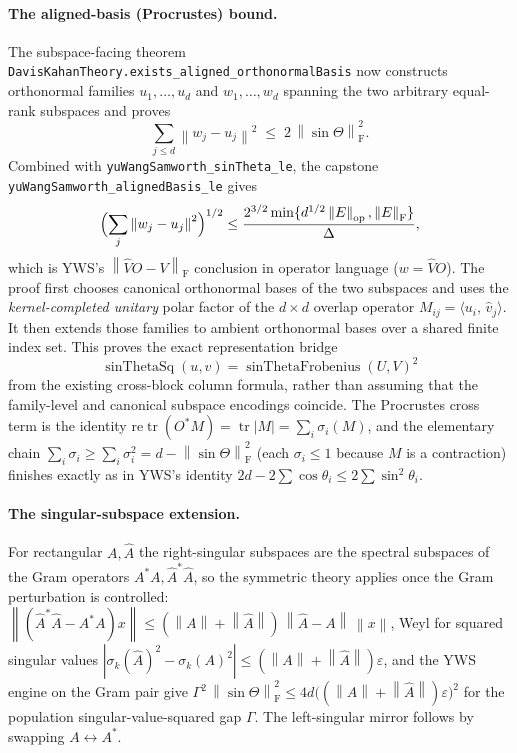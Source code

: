 \documentclass[11pt]{article}
\newcommand{\norm}[1]{\left\lVert #1\right\rVert}
\newcommand{\eps}{\varepsilon}
\newcommand{\F}{\mathrm{F}}
\newcommand{\op}{\mathrm{op}}
\newcommand{\inner}[2]{\langle #1,\,#2\rangle}
\newcommand{\sinT}{\sin\Theta}
\DeclareMathOperator{\tr}{tr}
\theoremstyle{remark}
\begin{document}
\paragraph{The aligned-basis (Procrustes) bound.}
The subspace-facing theorem
\texttt{DavisKahanTheory.exists\_aligned\_orthonormalBasis} now constructs
orthonormal families $u_1,\dots,u_d$ and $w_1,\dots,w_d$ spanning the two
arbitrary equal-rank subspaces and proves
\[
  \sum_{j\le d}\norm{w_j-u_j}^2\;\le\;2\,\norm{\sinT}_{\F}^2.
\]
Combined with \texttt{yuWangSamworth\_sinTheta\_le}, the capstone
\texttt{yuWangSamworth\_alignedBasis\_le} gives
\[
  \Bigl(\sum_j\norm{w_j-u_j}^2\Bigr)^{1/2}
  \le\frac{2^{3/2}\min\{d^{1/2}\norm{E}_{\op},\norm{E}_{\F}\}}{\Delta},
\]
which is YWS's $\norm{\widehat VO-V}_{\F}$ conclusion in operator language
($w=\widehat VO$).  The proof first chooses canonical orthonormal bases of the
two subspaces and uses the \emph{kernel-completed unitary} polar factor of the
$d\times d$ overlap operator $M_{ij}=\inner{u_i}{\widehat v_j}$.  It then
extends those families to ambient orthonormal bases over a shared finite index
set.  This proves the exact representation bridge
\[
  \operatorname{sinThetaSq}(u,v)
  = \operatorname{sinThetaFrobenius}(U,V)^2
\]
from the existing cross-block column formula, rather than assuming that the
family-level and canonical subspace encodings coincide.  The Procrustes cross
term is the identity
$\mathrm{re}\tr(O^{*}M)=\tr\lvert M\rvert=\sum_i\sigma_i(M)$, and the
elementary chain $\sum_i\sigma_i\ge\sum_i\sigma_i^2=d-\norm{\sinT}_{\F}^2$
(each $\sigma_i\le 1$ because $M$ is a contraction) finishes exactly as in
YWS's identity $2d-2\sum\cos\theta_i\le2\sum\sin^2\theta_i$.

\paragraph{The singular-subspace extension.}
For rectangular $A,\widehat A$ the right-singular subspaces are the spectral
subspaces of the Gram operators $A^{*}A,\widehat A^{*}\widehat A$, so the
symmetric theory applies once the Gram perturbation is controlled:
$\norm{(\widehat A^{*}\widehat A-A^{*}A)x}\le(\norm{A}+\norm{\widehat
A})\,\norm{\widehat A-A}\,\norm{x}$, Weyl for squared singular values
$|\sigma_k(\widehat A)^2-\sigma_k(A)^2|\le(\norm{A}+\norm{\widehat A})\eps$,
and the YWS engine on the Gram pair give
$\Gamma^2\,\norm{\sinT}_{\F}^2\le 4d\bigl((\norm{A}+\norm{\widehat
A})\eps\bigr)^2$ for the population singular-value-squared gap $\Gamma$.  The
left-singular mirror follows by swapping $A\leftrightarrow A^{*}$.
\end{document}
